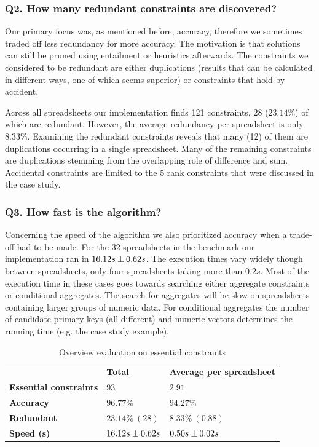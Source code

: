 \documentclass{ecai}
\begin{document}
\subsubsection*{Q2. How many redundant constraints are discovered?}
Our primary focus was, as mentioned before, accuracy, therefore we sometimes traded off less redundancy for more accuracy.
The motivation is that solutions can still be pruned using entailment or heuristics afterwards.
The constraints we considered to be redundant are either duplications (results that can be calculated in different ways, one of which seems superior) or constraints that hold by accident.

Across all spreadsheets our implementation finds 121 constraints, 28 ($23.14\%$) of which are redundant.
However, the average redundancy per spreadsheet is only $8.33\%$.
Examining the redundant constraints reveals that many (12) of them are duplications occurring in a single spreadsheet.
Many of the remaining constraints are duplications stemming from the overlapping role of difference and sum.
Accidental constraints are limited to the 5 rank constraints that were discussed in the case study.

\subsubsection*{Q3. How fast is the algorithm?}
Concerning the speed of the algorithm we also prioritized accuracy when a trade-off had to be made.
For the 32 spreadsheets in the benchmark our implementation ran in ${16.12}s \pm {0.62}s$.
The execution times vary widely though between spreadsheets, only four spreadsheets taking more than $0.2s$.
Most of the execution time in these cases goes towards searching either aggregate constraints or conditional aggregates.
The search for aggregates will be slow on spreadsheets containing larger groups of numeric data.
For conditional aggregates the number of candidate primary keys (all-different) and numeric vectors determines the running time (e.g. the case study example).

\begin{table}
  \centering
  \begin{tabular}{lll}
    & \textbf{Total} & \textbf{Average per spreadsheet} \\
    \textbf{Essential constraints} & $93$ & $2.91$ \\
    \textbf{Accuracy} & $96.77\%$ & $94.27\%$ \\
    \textbf{Redundant} & $23.14\%~(28)$ & $8.33\%~(0.88)$ \\
    \textbf{Speed (s)} & ${16.12}s \pm {0.62}s$ & ${0.50}s \pm {0.02}s$
  \end{tabular}
  \caption{Overview evaluation on essential constraints}
\end{table}
\end{document}
